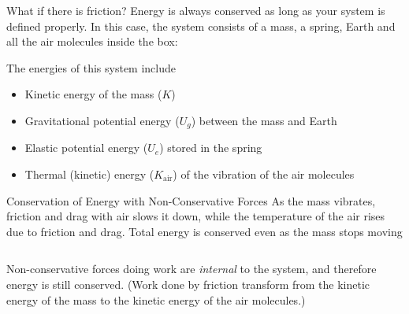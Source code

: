 \documentclass[12pt,compress,aspectratio=169]{beamer}
\begin{document}
\begin{frame}{What if there is friction?}
  Energy is always conserved as long as your system is defined properly. In
  this case, the system consists of a mass, a spring, Earth and all the air
  molecules inside the box:
  \begin{center}
  \end{center}
  The energies of this system include
  \begin{itemize}
  \item Kinetic energy of the mass ($K$)
  \item Gravitational potential energy ($U_g$) between the mass and Earth
  \item Elastic potential energy ($U_e$) stored in the spring
  \item Thermal (kinetic) energy ($K_\text{air}$) of the vibration of the air
    molecules
  \end{itemize}
\end{frame}



\begin{frame}{Conservation of Energy with Non-Conservative Forces}
  As the mass vibrates, friction and drag with air slows it down, while the
  temperature of the air rises due to friction and drag. Total energy is
  conserved even as the mass stops moving

  \vspace{.2in}
  \begin{columns}
    \centering

  \end{columns}

  \vspace{.2in}Non-conservative forces doing work are \emph{internal} to the
  system, and therefore energy is still conserved. (Work done by friction
  transform from the kinetic energy of the mass to the kinetic energy of the
  air molecules.)
\end{frame}
\end{document}
